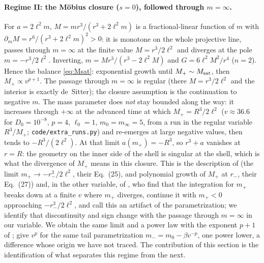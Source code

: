 \documentclass[11pt]{article}
\begin{document}
\paragraph{Regime II: the M\"obius closure ($s=0$), followed through $m=\infty$.} For $a=2\ell^2m$, $M=mr^3/(r^3+2\ell^2m)$ is a fractional-linear function of $m$ with $\partial_mM=r^6/(r^3+2\ell^2m)^2>0$: it is monotone on the whole projective line, passes through $m=\infty$ at the finite value $M=r^3/2\ell^2$ and diverges at the pole $m=-r^3/2\ell^2$. Inverting, $m=Mr^3/(r^3-2\ell^2M)$ and $G=6\ell^2M^2/r^4$ ($n=2$). Hence the balance \eqref{eq:Msat}: exponential growth until $M_+\sim M_{\rm sat}$, then $M_+\propto v^{p+1}$. The passage through $m=\infty$ is regular (there $M=r^3/2\ell^2$ and the interior is exactly de~Sitter); the closure assumption is the continuation to negative $m$. The mass parameter does \emph{not} stay bounded along the way: it increases through $+\infty$ at the advanced time at which $M_+=R^3/2\ell^2$ ($v\approx36.6$ for $D_0=10^{-8}$, $p=4$, $\ell_0=1$, $m_0=m_\infty=5$, from a run in the regular variable $R^3/M_+$; \texttt{code/extra\_runs.py}) and re-emerges at large negative values, then tends to $-R^3/(2\ell^2)$. At that limit $a(m_+)=-R^3$, so $r^3+a$ vanishes at $r=R$: the geometry on the inner side of the shell is singular at the shell, which is what the divergence of $M_+$ means in this closure. This is the description of \citet{Bonanno2021} (the limit $m_+\to-r_-^3/2\ell^2$, their Eq.~(25), and polynomial growth of $M_+$ at $r_-$, their Eq.~(27)) and, in the other variable, of \citet{CarballoRubio2021}, who find that the integration for $m_+$ breaks down at a finite $v$ where $m_+$ diverges, continue it with $m_+<0$ approaching $-r_-^3/2\ell^2$, and call this an artifact of the parametrization; we identify that discontinuity and sign change with the passage through $m=\infty$ in our variable. We obtain the same limit and a power law with the exponent $p+1$ of \citet{CarballoRubio2021}; \citet{Bonanno2021} give $v^{p}$ for the same tail parametrization $m_-=m_0-\beta v^{-p}$, one power lower, a difference whose origin we have not traced. The contribution of this section is the identification of what separates this regime from the next.
\end{document}
